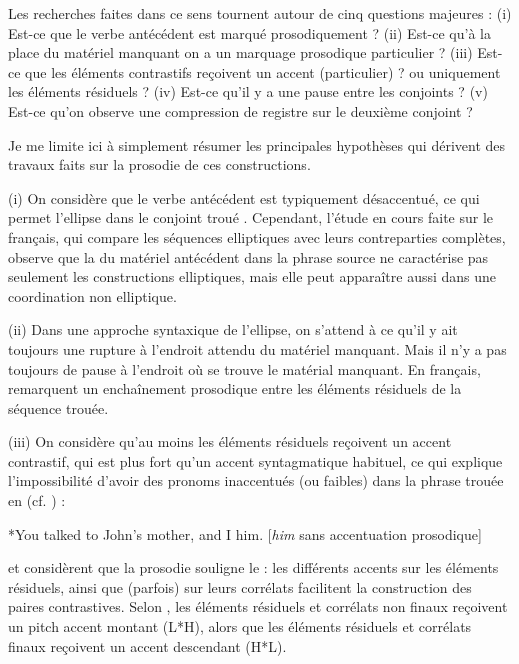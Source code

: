 Les recherches faites dans ce sens tournent autour de cinq questions majeures : (i) Est-ce que le verbe antécédent est marqué prosodiquement ? (ii) Est-ce qu’à la place du matériel manquant on a un marquage prosodique particulier ? (iii) Est-ce que les éléments contrastifs reçoivent un accent (particulier) ? ou uniquement les éléments résiduels ? (iv) Est-ce qu’il y a une pause entre les conjoints ? (v) Est-ce qu’on observe une compression de registre sur le deuxième conjoint ?

Je me limite ici à simplement résumer les principales hypothèses qui dérivent des travaux faits sur la prosodie de ces constructions.  

(i) On considère que le verbe antécédent est typiquement désaccentué, ce qui permet l’ellipse dans le conjoint troué \citep{Hartmann2000,Schwarz2000}. Cependant, l’étude en cours faite sur le français, qui compare les séquences elliptiques avec leurs contreparties complètes, observe que la  du matériel antécédent dans la phrase source ne caractérise pas seulement les constructions elliptiques, mais elle peut apparaître aussi dans une coordination non elliptique.  

(ii) Dans une approche syntaxique de l’ellipse, on s’attend à ce qu’il y ait toujours une rupture à l’endroit attendu du matériel manquant. Mais il n’y a pas toujours de pause à l’endroit où se trouve le matérial manquant. En français, \citet{AbeilleEtAlInPrep} remarquent un enchaînement prosodique entre les éléments résiduels de la séquence trouée. 

(iii) On considère qu’au moins les éléments résiduels reçoivent un accent con\-trastif, qui est plus fort qu’un accent syntagmatique habituel, ce qui explique l’impossibilité d’avoir des pronoms inaccentués (ou faibles) dans la phrase trouée en  (cf. \citealt{SagEtAl1985}) :
 
\ea \label{ch2:ex187}
*You talked to John’s mother, and I him.  [\textit{him} sans accentuation prosodique] \citep[161]{SagEtAl1985} 
\z

\noindent \citet{Hartmann2000} et \citet{FeryEtAl2005} considèrent que la prosodie souligne le  : les différents accents sur les éléments résiduels, ainsi que (parfois) sur leurs corrélats facilitent la construction des paires contrastives. Selon \citet{FeryEtAl2005}, les éléments résiduels et corrélats non finaux reçoivent un pitch accent montant (L*H), alors que les éléments résiduels et corrélats finaux reçoivent un accent descendant (H*L). 

